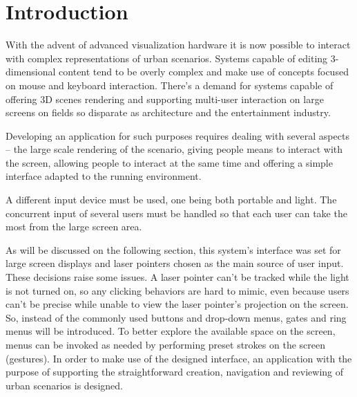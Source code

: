 \chapter{Introduction}






With the advent of advanced visualization hardware it is now possible
to interact with complex representations of urban scenarios.
Systems capable of editing 3-dimensional content
tend to be overly complex and make use of concepts
focused on mouse and keyboard interaction.
There's a demand for systems capable of offering 3D scenes rendering
and supporting multi-user interaction on large screens on fields
so disparate as architecture and the entertainment industry.



Developing an application for such purposes requires dealing with several aspects
-- the large scale rendering of the scenario,
giving people means to interact with the screen,
allowing people to interact at the same time and
offering a simple interface adapted to the running environment.



A different input device must be used, one being both portable and light.
The concurrent input of several users must be handled so that each user can
take the most from the large screen area.

As will be discussed on the following section, this system's interface was set
for large screen displays and laser pointers chosen as the main source of user input.
These decisions raise some issues.
A laser pointer can't be tracked while the light is not turned on,
so any clicking behaviors are hard to mimic, even because users can't be 
precise while unable to view the laser pointer's projection on the screen.
So, instead of the commonly used buttons and drop-down menus,
gates and ring menus will be introduced.
To better explore the available space on the screen,
menus can be invoked as needed by performing preset strokes on the screen (gestures).
In order to make use of the designed interface, an application with the
purpose of supporting the straightforward creation, navigation and reviewing of urban scenarios is designed.


